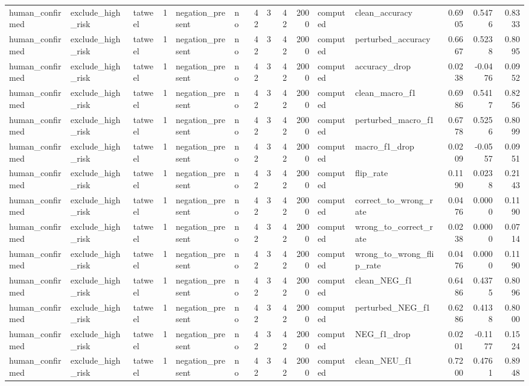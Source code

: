 \begin{tabular}{lllrllrrrrllrrr}
human_confirmed & exclude_high_risk & tatweel & 1 & negation_present & no & 42 & 3 & 42 & 2000 & computed & clean_accuracy & 0.6905 & 0.5476 & 0.8333 \\
human_confirmed & exclude_high_risk & tatweel & 1 & negation_present & no & 42 & 3 & 42 & 2000 & computed & perturbed_accuracy & 0.6667 & 0.5238 & 0.8095 \\
human_confirmed & exclude_high_risk & tatweel & 1 & negation_present & no & 42 & 3 & 42 & 2000 & computed & accuracy_drop & 0.0238 & -0.0476 & 0.0952 \\
human_confirmed & exclude_high_risk & tatweel & 1 & negation_present & no & 42 & 3 & 42 & 2000 & computed & clean_macro_f1 & 0.6986 & 0.5417 & 0.8256 \\
human_confirmed & exclude_high_risk & tatweel & 1 & negation_present & no & 42 & 3 & 42 & 2000 & computed & perturbed_macro_f1 & 0.6778 & 0.5256 & 0.8099 \\
human_confirmed & exclude_high_risk & tatweel & 1 & negation_present & no & 42 & 3 & 42 & 2000 & computed & macro_f1_drop & 0.0209 & -0.0557 & 0.0951 \\
human_confirmed & exclude_high_risk & tatweel & 1 & negation_present & no & 42 & 3 & 42 & 2000 & computed & flip_rate & 0.1190 & 0.0238 & 0.2143 \\
human_confirmed & exclude_high_risk & tatweel & 1 & negation_present & no & 42 & 3 & 42 & 2000 & computed & correct_to_wrong_rate & 0.0476 & 0.0000 & 0.1190 \\
human_confirmed & exclude_high_risk & tatweel & 1 & negation_present & no & 42 & 3 & 42 & 2000 & computed & wrong_to_correct_rate & 0.0238 & 0.0000 & 0.0714 \\
human_confirmed & exclude_high_risk & tatweel & 1 & negation_present & no & 42 & 3 & 42 & 2000 & computed & wrong_to_wrong_flip_rate & 0.0476 & 0.0000 & 0.1190 \\
human_confirmed & exclude_high_risk & tatweel & 1 & negation_present & no & 42 & 3 & 42 & 2000 & computed & clean_NEG_f1 & 0.6486 & 0.4375 & 0.8096 \\
human_confirmed & exclude_high_risk & tatweel & 1 & negation_present & no & 42 & 3 & 42 & 2000 & computed & perturbed_NEG_f1 & 0.6286 & 0.4138 & 0.8000 \\
human_confirmed & exclude_high_risk & tatweel & 1 & negation_present & no & 42 & 3 & 42 & 2000 & computed & NEG_f1_drop & 0.0201 & -0.1177 & 0.1524 \\
human_confirmed & exclude_high_risk & tatweel & 1 & negation_present & no & 42 & 3 & 42 & 2000 & computed & clean_NEU_f1 & 0.7200 & 0.4761 & 0.8948 \\

\end{tabular}
